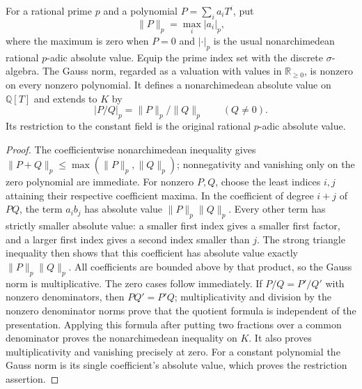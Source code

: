 \begin{definition}
\label{def:rational-prime-place}
\leanok
For a rational prime $p$ and a polynomial $P=\sum_i a_iT^i$, put
\[
 \lVert P\rVert_p=\max_i|a_i|_p,
\]
where the maximum is zero when $P=0$ and $|\cdot|_p$ is the usual
nonarchimedean rational $p$-adic absolute value. Equip the prime index
set with the discrete $\sigma$-algebra. The Gauss norm, regarded as a
valuation with values in $\mathbb R_{\geq0}$, is nonzero on every
nonzero polynomial. It defines a nonarchimedean absolute value on
$\mathbb Q[T]$ and extends to $K$ by
\[
 |P/Q|_p=\lVert P\rVert_p/\lVert Q\rVert_p\qquad(Q\ne0).
\]
Its restriction to the constant field is the original rational
$p$-adic absolute value.
\end{definition}
\begin{proof}
The coefficientwise nonarchimedean inequality gives
$\lVert P+Q\rVert_p\leq\max(\lVert P\rVert_p,\lVert Q\rVert_p)$;
nonnegativity and vanishing only on the zero polynomial are immediate.
For nonzero $P,Q$, choose the least indices $i,j$ attaining their
respective coefficient maxima. In the coefficient of degree $i+j$ of
$PQ$, the term $a_ib_j$ has absolute value
$\lVert P\rVert_p\lVert Q\rVert_p$. Every other term has strictly
smaller absolute value: a smaller first index gives a smaller first
factor, and a larger first index gives a second index smaller than $j$.
The strong triangle inequality then shows that this coefficient has
absolute value exactly $\lVert P\rVert_p\lVert Q\rVert_p$.
All coefficients are bounded above by that product, so the Gauss norm
is multiplicative. The zero cases follow immediately.
If $P/Q=P'/Q'$ with nonzero denominators, then $PQ'=P'Q$;
multiplicativity and division by the nonzero denominator norms prove
that the quotient formula is independent of the presentation.
Applying this formula after putting two fractions over a common
denominator proves the nonarchimedean inequality on $K$.
It also proves multiplicativity and vanishing precisely at zero.
For a constant polynomial the Gauss norm is its single coefficient's
absolute value, which proves the restriction assertion.
\end{proof}

